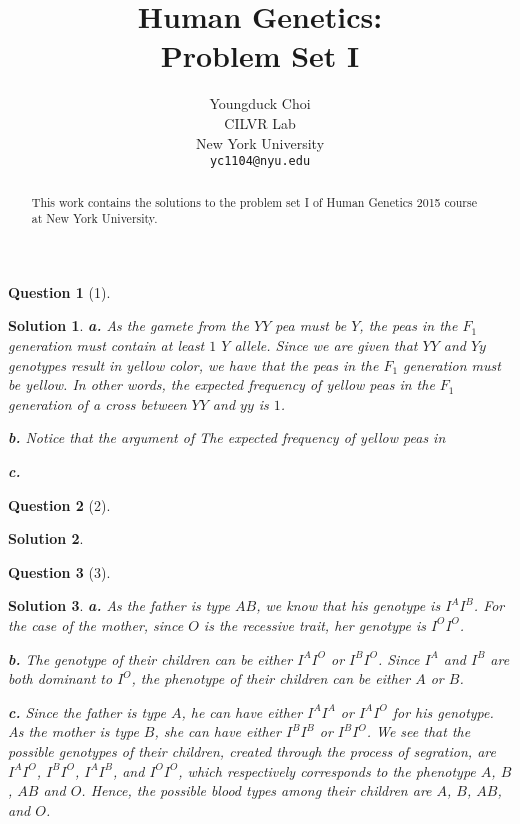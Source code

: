 \documentclass{article} %
\title{Human Genetics: \\
Problem Set I}
\author{
Youngduck Choi \\
CILVR Lab \\
New York University\\
\texttt{yc1104@nyu.edu} \\
}
\theoremstyle{quest}
\newtheorem*{question}{Question}
\newtheorem*{solution}{Solution}
\begin{document}
\maketitle

\begin{abstract}
This work contains the solutions to the problem set I
of Human Genetics 2015 course at New York University.
\end{abstract}

\begin{question}[1] 
\end{question}

\smallskip

\begin{solution}
\textbf{a.} As the gamete from the $YY$ pea must be $Y$, the peas in the $F_1$ generation
must contain at least $1$ $Y$ allele. Since we are given that $YY$ and $Yy$ genotypes result
in yellow color, we have that the peas in the $F_1$ generation must be yellow. In other words,
the expected frequency of yellow peas in the $F_1$ generation of a cross between $YY$ and $yy$
is $1$.

\smallskip

\textbf{b.} Notice that the argument of 
The expected frequency of yellow peas in 

\smallskip

\textbf{c.}

\smallskip

\end{solution}

\bigskip


\begin{question}[2]
\end{question}
\begin{solution}
\end{solution}

\bigskip

\begin{question}[3]
\end{question}
\begin{solution}
\textbf{a.} As the father is type $AB$, we know that his genotype is $I^A I^B$. For the case of the mother,
since $O$ is the recessive trait, her genotype is $I^O I^O$. \\

\smallskip

\textbf{b.} The genotype of their children can be either $I^A I^O$ or $I^B I^O$. Since 
$I^A$ and $I^B$ are both dominant to $I^O$, the phenotype of their children can be
either $A$ or $B$.

\smallskip

\textbf{c.} Since the father is type $A$, he can have either $I^A I^A$ or $I^A I^O$ 
for his genotype. As the mother is type $B$, she can have either $I^B I^B$ or $I^B I^O$.
We see that the possible genotypes of their children, created through the process of 
segration, are $I^A I^O$, $I^B I^O$, $I^A I^B$, and $I^O I^O$, which respectively corresponds
to the phenotype $A$, $B$, $AB$ and $O$.
Hence, the possible blood types among their children are $A$, $B$, $AB$, and $O$.


\end{solution}
\end{document}
